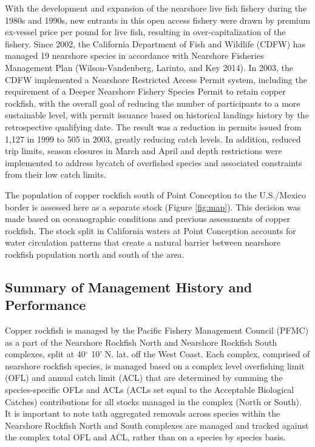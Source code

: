 \documentclass[11pt,
  english,
  letterpaper,
]{article}
\begin{document}
With the development and expansion of the nearshore live fish fishery during the 1980s and 1990s, new entrants in this open access fishery were drawn by premium ex-vessel price per pound for live fish, resulting in over-capitalization of the fishery. Since 2002, the California Department of Fish and Wildlife (CDFW) has managed 19 nearshore species in accordance with Nearshore Fisheries Management Plan (Wilson-Vandenberg, Larinto, and Key 2014). In 2003, the CDFW implemented a Nearshore Restricted Access Permit system, including the requirement of a Deeper Nearshore Fishery Species Permit to retain copper rockfish, with the overall goal of reducing the number of participants to a more sustainable level, with permit issuance based on historical landings history by the retrospective qualifying date. The result was a reduction in permits issued from 1,127 in 1999 to 505 in 2003, greatly reducing catch levels. In addition, reduced trip limits, season closures in March and April and depth restrictions were implemented to address bycatch of overfished species and associated constraints from their low catch limits.

The population of copper rockfish south of Point Conception to the U.S./Mexico border is assessed here as a separate stock (Figure \ref{fig:map}). This decision was made based on oceanographic conditions and previous assessments of copper rockfish. The stock split in California waters at Point Conception accounts for water circulation patterns that create a natural barrier between nearshore rockfish population north and south of the area.

\hypertarget{summary-of-management-history-and-performance}{%
\subsection{Summary of Management History and Performance}\label{summary-of-management-history-and-performance}}

Copper rockfish is managed by the Pacific Fishery Management Council (PFMC) as a part of the Nearshore Rockfish North and Nearshore Rockfish South complexes, split at 40\(^\circ\) 10' N. lat. off the West Coast. Each complex, comprised of nearshore rockfish species, is managed based on a complex level overfishing limit (OFL) and annual catch limit (ACL) that are determined by summing the species-specific OFLs and ACLs (ACLs set equal to the Acceptable Biological Catches) contributions for all stocks managed in the complex (North or South). It is important to note tath aggregated removals across species within the Nearshore Rockfish North and South complexes are managed and tracked against the complex total OFL and ACL, rather than on a species by species basis.
\end{document}
